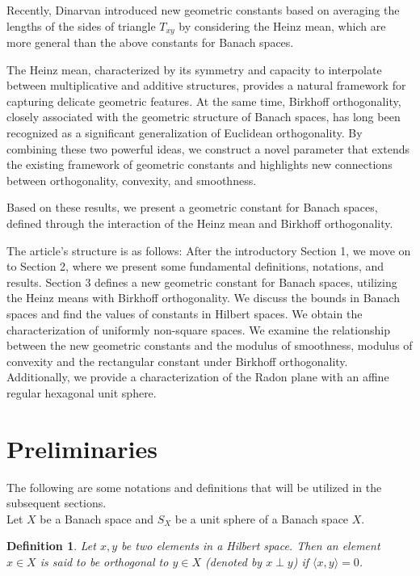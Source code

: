 \documentclass[preprint,12pt]{elsarticle}
\newtheorem{definition}[thm]{Definition}
\numberwithin{equation}{section}
\begin{document}
Recently, Dinarvan \cite{dinarvand2019heinz} introduced new geometric constants based on averaging the lengths of the sides of triangle $T_{xy}$ by considering the Heinz
 mean, which are more general than the above constants for Banach spaces.

The Heinz mean, characterized by its symmetry and capacity to interpolate between multiplicative and additive structures, provides a natural framework for capturing delicate geometric features. At the same time,  Birkhoff orthogonality, closely associated with the geometric structure of Banach spaces, has long been recognized as a significant generalization of Euclidean orthogonality. By combining these two powerful ideas, we construct a novel parameter that extends the existing framework of geometric constants and highlights new connections between orthogonality, convexity, and smoothness. 

Based on these results, we present a geometric constant for Banach spaces, defined through the interaction of the Heinz mean and Birkhoff orthogonality. 

 The article's structure is as follows: After the introductory Section 1, we move on to Section 2, where we present some fundamental definitions, notations, and results. Section 3 defines a new geometric constant for Banach spaces, utilizing the Heinz means with Birkhoff orthogonality. We discuss the bounds in Banach spaces and find the values of constants in Hilbert spaces. We obtain the characterization of uniformly non-square spaces. We examine the relationship between the new geometric constants and the modulus of smoothness, modulus of convexity and the rectangular constant under Birkhoff orthogonality. Additionally, we provide a characterization of the Radon plane with an affine regular hexagonal unit sphere.
 





\section{Preliminaries}
The following are some notations and definitions that will be utilized in the subsequent sections.\\
Let $X$ be a Banach space and $S_X$ be a unit sphere of a Banach space $X$.
\begin{definition}
Let $x,y$ be two elements in a Hilbert space. Then an element $x \in X$ is said to be orthogonal 
to $y \in X$ (denoted by $x \perp y$) if $\langle x,y \rangle = 0$.   
\end{definition}
\end{document}
